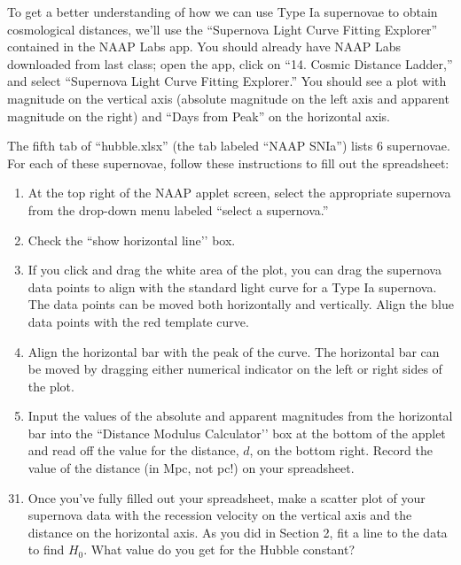 \documentclass[11pt]{article}
\begin{document}
\bigskip
To get a better understanding of how we can use Type Ia supernovae to obtain cosmological distances, we'll use the ``Supernova Light Curve Fitting Explorer'' contained in the NAAP Labs app. You should already have NAAP Labs downloaded from last class; open the app, click on ``14. Cosmic Distance Ladder,'' and select ``Supernova Light Curve Fitting Explorer.'' You should see a plot with magnitude on the vertical axis (absolute magnitude on the left axis and apparent magnitude on the right) and ``Days from Peak'' on the horizontal axis.

The fifth tab of ``hubble.xlsx'' (the tab labeled ``NAAP SNIa'') lists 6 supernovae. For each of these supernovae, follow these instructions to fill out the spreadsheet:
\begin{enumerate}[label=Step \arabic*:]
    \item At the top right of the NAAP applet screen, select the appropriate supernova from the drop-down menu labeled ``select a supernova.''
    
    \item Check the ``show horizontal line'’ box.
    
    \item If you click and drag the white area of the plot, you can drag the supernova data points to align with the standard light curve for a Type Ia supernova. The data points can be moved both horizontally and vertically. Align the blue data points with the red template curve.
    
    \item Align the horizontal bar with the peak of the curve. The horizontal bar can be moved by dragging either numerical indicator on the left or right sides of the plot.
    
    \item Input the values of the absolute and apparent magnitudes from the horizontal bar into the ``Distance Modulus Calculator'’ box at the bottom of the applet and read off the value for the distance, $d$, on the bottom right. Record the value of the distance (in Mpc, not pc!) on your spreadsheet.
    
\end{enumerate} 
\bigskip

\begin{enumerate}
    \setcounter{enumi}{30}
    
    \item Once you've fully filled out your spreadsheet, make a scatter plot of your supernova data with the recession velocity on the vertical axis and the distance on the horizontal axis. As you did in Section 2, fit a line to the data to find $H_0$. What value do you get for the Hubble constant?
\end{enumerate}
\end{document}
